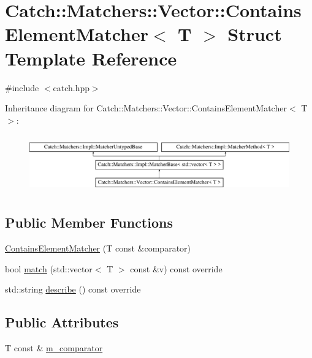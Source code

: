 \hypertarget{struct_catch_1_1_matchers_1_1_vector_1_1_contains_element_matcher}{}\section{Catch\+::Matchers\+::Vector\+::Contains\+Element\+Matcher$<$ T $>$ Struct Template Reference}
\label{struct_catch_1_1_matchers_1_1_vector_1_1_contains_element_matcher}


{\ttfamily \#include $<$catch.\+hpp$>$}

Inheritance diagram for Catch\+::Matchers\+::Vector\+::Contains\+Element\+Matcher$<$ T $>$\+:\begin{figure}[H]
\begin{center}
\leavevmode
\includegraphics[height=2.514970cm]{struct_catch_1_1_matchers_1_1_vector_1_1_contains_element_matcher}
\end{center}
\end{figure}
\subsection*{Public Member Functions}
\begin{DoxyCompactItemize}
\item 
\mbox{\hyperlink{struct_catch_1_1_matchers_1_1_vector_1_1_contains_element_matcher_a6a05740b5d3f89fac8de84ac0cff7b93}{Contains\+Element\+Matcher}} (T const \&comparator)
\item 
bool \mbox{\hyperlink{struct_catch_1_1_matchers_1_1_vector_1_1_contains_element_matcher_a6a4be6e5642e267433d370649beb0fac}{match}} (std\+::vector$<$ T $>$ const \&v) const override
\item 
std\+::string \mbox{\hyperlink{struct_catch_1_1_matchers_1_1_vector_1_1_contains_element_matcher_aea3b674389a0afd82af6ba4b10f86ae6}{describe}} () const override
\end{DoxyCompactItemize}
\subsection*{Public Attributes}
\begin{DoxyCompactItemize}
\item 
T const  \& \mbox{\hyperlink{struct_catch_1_1_matchers_1_1_vector_1_1_contains_element_matcher_ab7eada6c4bbce1d21b44773262f9cb23}{m\+\_\+comparator}}
\end{DoxyCompactItemize}
